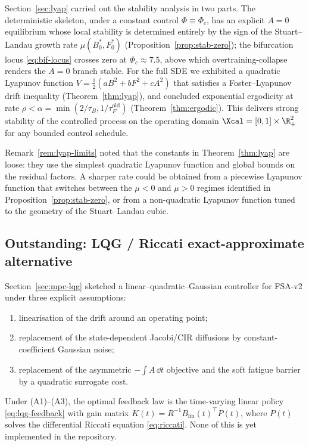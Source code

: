 Section~\ref{sec:lyap} carried out the stability analysis in two
parts. The deterministic skeleton, under a constant control
$\Phi \equiv \Phi_c$, has an explicit $A=0$ equilibrium whose local
stability is determined entirely by the sign of the Stuart--Landau
growth rate $\mu(B^*_0,F^*_0)$
(Proposition~\ref{prop:stab-zero}); the bifurcation locus
\eqref{eq:bif-locus} crosses zero at $\Phi_c \approx 7.5$, above which
overtraining-collapse renders the $A=0$ branch stable. For the full
SDE we exhibited a quadratic Lyapunov function
$V = \tfrac12(aB^2+bF^2+cA^2)$ that satisfies a Foster--Lyapunov drift
inequality (Theorem~\ref{thm:lyap}), and concluded exponential
ergodicity at rate
$\rho < \alpha = \min(2/\tau_B,1/\tau_F^{\mathrm{old}})$
(Theorem~\ref{thm:ergodic}). This delivers strong stability of the
controlled process on the operating domain
$\Xcal = [0,1]\times\R_+^2$ for any bounded control schedule.

Remark~\ref{rem:lyap-limits} noted that the constants in
Theorem~\ref{thm:lyap} are loose: they use the simplest quadratic
Lyapunov function and global bounds on the residual factors. A
sharper rate could be obtained from a piecewise Lyapunov function
that switches between the $\mu < 0$ and $\mu > 0$ regimes identified
in Proposition~\ref{prop:stab-zero}, or from a non-quadratic Lyapunov
function tuned to the geometry of the Stuart--Landau cubic.

\subsection{Outstanding: LQG / Riccati
exact-approximate alternative}\label{sec:discussion-lqg}

Section~\ref{sec:mpc-lqg} sketched a linear--quadratic--Gaussian
controller for FSA-v2 under three explicit assumptions:
\begin{enumerate}
  \item[(A1)] linearisation of the drift around an operating point;
  \item[(A2)] replacement of the state-dependent Jacobi/CIR diffusions
        by constant-coefficient Gaussian noise;
  \item[(A3)] replacement of the asymmetric $-\!\int A\,\dd t$
        objective and the soft fatigue barrier by a quadratic
        surrogate cost.
\end{enumerate}
Under (A1)--(A3), the optimal feedback law is the time-varying linear
policy \eqref{eq:lqg-feedback} with gain matrix $K(t) = R^{-1}
B_{\mathrm{lin}}(t)^\top P(t)$, where $P(t)$ solves the differential
Riccati equation \eqref{eq:riccati}. None of this is yet implemented
in the repository.

